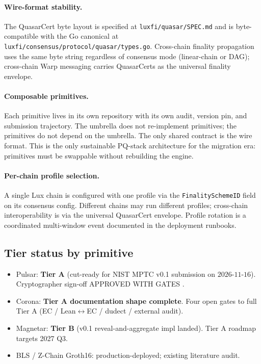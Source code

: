 \paragraph{Wire-format stability.} The QuasarCert byte layout is
specified at \texttt{luxfi/quasar/SPEC.md} and is byte-compatible
with the Go canonical at \texttt{luxfi/consensus/protocol/quasar/types.go}.
Cross-chain finality propagation uses the same byte string
regardless of consensus mode (linear-chain or DAG); cross-chain
Warp messaging carries QuasarCerts as the universal finality
envelope.

\paragraph{Composable primitives.} Each primitive lives in its own
repository with its own audit, version pin, and submission
trajectory. The umbrella does not re-implement primitives; the
primitives do not depend on the umbrella. The only shared contract
is the wire format. This is the only sustainable PQ-stack
architecture for the migration era: primitives must be swappable
without rebuilding the engine.

\paragraph{Per-chain profile selection.} A single Lux chain is
configured with one profile via the \texttt{FinalitySchemeID}
field on its consensus config. Different chains may run different
profiles; cross-chain interoperability is via the universal
QuasarCert envelope. Profile rotation is a coordinated
multi-window event documented in the deployment runbooks.

\subsection{Tier status by primitive}

\begin{itemize}[leftmargin=2em,nosep]
\item Pulsar: \textbf{Tier A} (cut-ready for NIST MPTC v0.1
      submission on $2026$-$11$-$16$). Cryptographer sign-off
      APPROVED WITH GATES \cite{pulsar}.
\item Corona: \textbf{Tier A documentation shape complete}.
      Four open gates to full Tier A
      (EC / Lean$\leftrightarrow$EC / dudect / external audit).
\item Magnetar: \textbf{Tier B} (v0.1 reveal-and-aggregate impl
      landed). Tier A roadmap targets 2027 Q3.
\item BLS / Z-Chain Groth16: production-deployed; existing
      literature audit.
\end{itemize}

